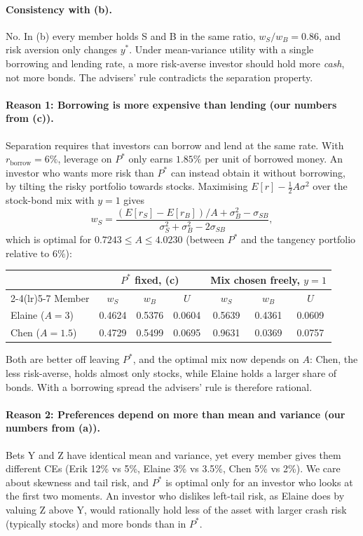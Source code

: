 \documentclass[11pt]{article}
\newcommand{\rborrow}{r_{\text{borrow}}}
\begin{document}
\paragraph{Consistency with (b).}
No. In (b) every member holds S and B in the same ratio, $w_S/w_B = 0.86$, and risk aversion only changes $y^*$. Under mean-variance utility with a single borrowing and lending rate, a more risk-averse investor should hold more \emph{cash}, not more bonds. The advisers' rule contradicts the separation property.

\paragraph{Reason 1: Borrowing is more expensive than lending (our numbers from (c)).}
Separation requires that investors can borrow and lend at the same rate. With $\rborrow = 6\%$, leverage on $P^*$ only earns $1.85\%$ per unit of borrowed money. An investor who wants more risk than $P^*$ can instead obtain it without borrowing, by tilting the risky portfolio towards stocks. Maximising $E[r] - \tfrac12 A\sigma^2$ over the stock-bond mix with $y = 1$ gives
\[
w_S = \frac{(E[r_S] - E[r_B])/A + \sigma_B^2 - \sigma_{SB}}{\sigma_S^2 + \sigma_B^2 - 2\sigma_{SB}},
\]
which is optimal for $0.7243 \le A \le 4.0230$ (between $P^*$ and the tangency portfolio relative to $6\%$):

\begin{center}
\begin{tabular}{lcccccc}
\toprule
& \multicolumn{3}{c}{$P^*$ fixed, (c)} & \multicolumn{3}{c}{Mix chosen freely, $y = 1$} \\
\cmidrule(lr){2-4}\cmidrule(lr){5-7}
Member & $w_S$ & $w_B$ & $U$ & $w_S$ & $w_B$ & $U$ \\
\midrule
Elaine ($A = 3$)   & 0.4624 & 0.5376 & 0.0604 & 0.5639 & 0.4361 & 0.0609 \\
Chen ($A = 1.5$)   & 0.4729 & 0.5499 & 0.0695 & 0.9631 & 0.0369 & 0.0757 \\
\bottomrule
\end{tabular}
\end{center}

Both are better off leaving $P^*$, and the optimal mix now depends on $A$: Chen, the less risk-averse, holds almost only stocks, while Elaine holds a larger share of bonds. With a borrowing spread the advisers' rule is therefore rational.

\paragraph{Reason 2: Preferences depend on more than mean and variance (our numbers from (a)).}
Bets Y and Z have identical mean and variance, yet every member gives them different CEs (Erik 12\% vs 5\%, Elaine 3\% vs 3.5\%, Chen 5\% vs 2\%). We care about skewness and tail risk, and $P^*$ is optimal only for an investor who looks at the first two moments. An investor who dislikes left-tail risk, as Elaine does by valuing Z above Y, would rationally hold less of the asset with larger crash risk (typically stocks) and more bonds than in $P^*$.
\end{document}
